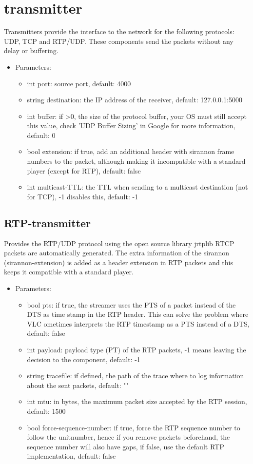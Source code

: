\section{transmitter}
Transmitters provide the interface to the network for the following protocols: UDP, TCP and RTP/UDP. These components send the packets without any delay or buffering.
\begin{itemize}
\item Parameters:
\begin{itemize}
\item int port: source port, default: 4000
\item string destination: the IP address of the receiver, default: 127.0.0.1:5000
\item int buffer: if >0, the size of the protocol buffer, your OS must still accept this value, check 'UDP Buffer Sizing' in Google for more information, default: 0
\item bool extension: if true, add an additional header with sirannon frame numbers to the packet, although making it incompatible with a standard player (except for RTP), default: false
\item int multicast-TTL: the TTL when sending to a multicast destination (not for TCP), -1 disables this, default: -1
\end{itemize}
\end{itemize}
\subsection{RTP-transmitter}
Provides the RTP/UDP protocol using the open source library jrtplib RTCP packets are automatically generated. The extra information of the sirannon (sirannon-extension) is added as a header extension in RTP packets and this keeps it compatible with a standard player.
\begin{itemize}
\item Parameters:
\begin{itemize}
\item bool pts: if true, the streamer uses the PTS of a packet instead of the DTS as time stamp in the RTP header. This can solve the problem where VLC ometimes interprets the RTP timestamp as a PTS instead of a DTS, default: false
\item int payload: payload type (PT) of the RTP packets, -1 means leaving the decision to the component, default: -1
\item string tracefile: if defined, the path of the trace where to log information about the sent packets, default: ""
\item int mtu: in bytes, the maximum packet size accepted by the RTP session, default: 1500
\item bool force-sequence-number: if true, force the RTP sequence number to follow the unitnumber, hence if you remove packets beforehand, the sequence number will also have gaps, if false, use the default RTP implementation, default: false
\end{itemize}
\end{itemize}
